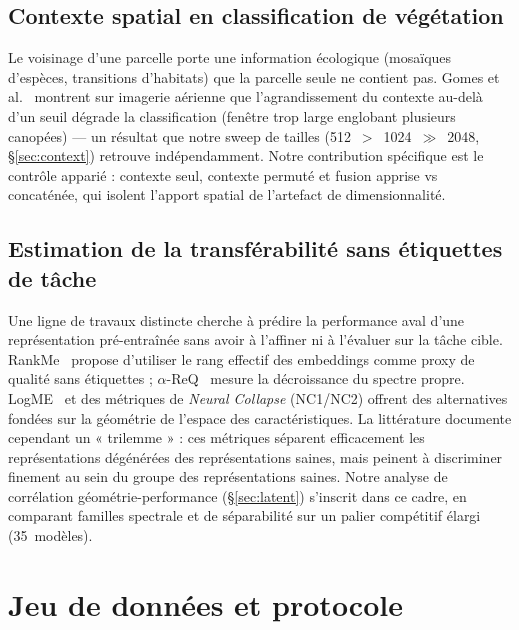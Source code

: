 \documentclass[11pt,a4paper]{article}
\begin{document}
\subsection{Contexte spatial en classification de végétation}

Le voisinage d'une parcelle porte une information écologique (mosaïques d'espèces, transitions d'habitats) que la parcelle seule ne contient pas. Gomes et al.~\autocite{gomes2026efficient} montrent sur imagerie aérienne que l'agrandissement du contexte au-delà d'un seuil dégrade la classification (fenêtre trop large englobant plusieurs canopées) — un résultat que notre sweep de tailles (512~$>$~1024~$\gg$~2048, \S\ref{sec:context}) retrouve indépendamment. Notre contribution spécifique est le contrôle apparié : contexte seul, contexte permuté et fusion apprise vs concaténée, qui isolent l'apport spatial de l'artefact de dimensionnalité.

\subsection{Estimation de la transférabilité sans étiquettes de tâche}

Une ligne de travaux distincte cherche à prédire la performance aval d'une représentation pré-entraînée sans avoir à l'affiner ni à l'évaluer sur la tâche cible. RankMe~\autocite{garrido2023rankme} propose d'utiliser le rang effectif des embeddings comme proxy de qualité sans étiquettes ; $\alpha$-ReQ~\autocite{agrawal2022alphareq} mesure la décroissance du spectre propre. LogME~\autocite{you2021logme} et des métriques de \emph{Neural Collapse} (NC1/NC2) offrent des alternatives fondées sur la géométrie de l'espace des caractéristiques. La littérature documente cependant un « trilemme » : ces métriques séparent efficacement les représentations dégénérées des représentations saines, mais peinent à discriminer finement au sein du groupe des représentations saines. Notre analyse de corrélation géométrie-performance (\S\ref{sec:latent}) s'inscrit dans ce cadre, en comparant familles spectrale et de séparabilité sur un palier compétitif élargi (35~modèles).

\section{Jeu de données et protocole}
\label{sec:methods}
\end{document}
